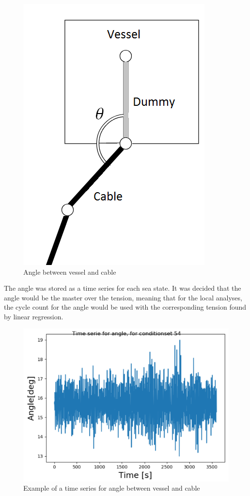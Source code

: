 \begin{figure}[H]
\centering
\includegraphics[scale=0.55]{figures/angle}
\caption[Angle between vessel and cable ]{Angle between vessel and cable  }
 \label{fig:angle}
\end{figure}

\noindent The angle was stored as a time series for each sea state. It was decided that the angle would be the master over the tension, meaning that for the local analyses, the cycle count for the angle would be used with the corresponding tension found by linear regression. 

\begin{figure}[H]
\centering
\includegraphics[scale=0.8]{figures/angtsex}
\caption[Example of a time series for Angle between vessel and cable  ]{Example of a time series for angle between vessel and cable}
 \label{fig:angleex}
\end{figure}


